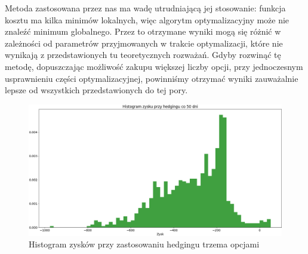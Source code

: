 \documentclass[12pt]{article}
\begin{document}
Metoda zastosowana przez nas ma wadę utrudniającą jej stosowanie: funkcja kosztu ma kilka minimów lokalnych, więc algorytm optymalizacyjny może nie znaleźć minimum globalnego. Przez to otrzymane wyniki mogą się różnić w zależności od parametrów przyjmowanych w trakcie optymalizacji, które nie wynikają z przedstawionych tu teoretycznych rozważań. Gdyby rozwinąć tę metodę, dopuszczając możliwość zakupu większej liczby opcji, przy jednoczesnym usprawnieniu części optymalizacyjnej, powinniśmy otrzymać wyniki zauważalnie lepsze od wszystkich przedstawionych do tej pory.
\begin{figure}[htp]
    \centering
    \includegraphics[width=\textwidth,height=\textheight,keepaspectratio]{multi_hedg_f50_dif12.png}
    \caption{Histogram zysków przy zastosowaniu hedgingu trzema opcjami}
    \label{fig:hist_multi_gamma_12_50}
\end{figure}
\end{document}
